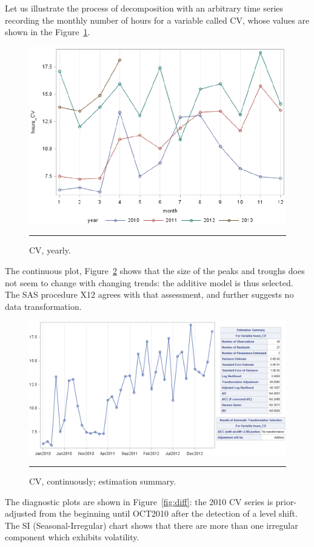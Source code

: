 Let us illustrate the process of decomposition with an arbitrary time series recording the monthly number of hours for a variable called CV, whose values are shown in the Figure~\ref{fig:cv}. 
\begin{figure}[t]
\centering
\includegraphics[width=\textwidth]{Images/CV_by_year-timeseries.png}
\caption{CV, yearly.}\hrule
\label{fig:cv}
\end{figure}
The continuous plot, Figure~\ref{fig:cv_cont} shows that the size of the peaks and troughs does not seem to change with changing trends: the additive model is thus selected. The SAS procedure X12 agrees with that assessment, and further suggests no data transformation.
\begin{figure}[t]
\centering
\includegraphics[width=\textwidth]{Images/CV_continuously.png}
\caption{CV, continuously; estimation summary.}\hrule
\label{fig:cv_cont}
\end{figure}
The diagnostic plots are shown in Figure~\ref{fig:diff}: the 2010 CV series is prior-adjusted from the beginning until OCT2010 after the detection of a level shift. The SI (Seasonal-Irregular) chart shows that there are more than one irregular component which exhibits volatility.
